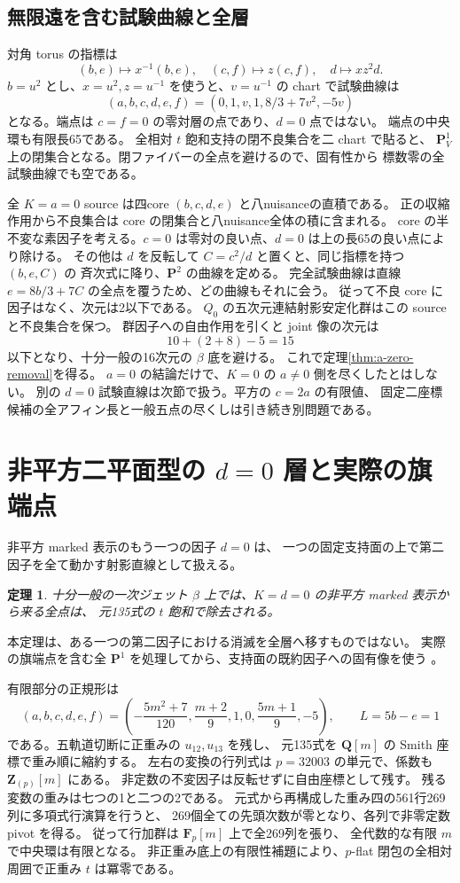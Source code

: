 \documentclass[11pt,a4paper]{ltjsarticle}
\newcommand{\QQ}{\mathbf Q}
\newcommand{\PP}{\mathbf P}
\newtheorem{theorem}{定理}[section]
\theoremstyle{remark}
\begin{document}
\subsection{無限遠を含む試験曲線と全層}
対角 torus の指標は
\[
 (b,e)\mapsto x^{-1}(b,e),\quad(c,f)\mapsto z(c,f),
 \quad d\mapsto xz^2d.
\]
$b=u^2$ とし、$x=u^2,z=u^{-1}$ を使うと、$v=u^{-1}$ の chart で試験曲線は
\[
 (a,b,c,d,e,f)=(0,1,v,1,8/3+7v^2,-5v)
\]
となる。端点は $c=f=0$ の零対層の点であり、$d=0$ 点ではない。
端点の中央環も有限長65である。
全相対 $t$ 飽和支持の閉不良集合を二 chart で貼ると、
$\PP^1_V$ 上の閉集合となる。閉ファイバーの全点を避けるので、固有性から
標数零の全試験曲線でも空である。

全 $K=a=0$ source は四core $(b,c,d,e)$ と八nuisanceの直積である。
正の収縮作用から不良集合は core の閉集合と八nuisance全体の積に含まれる。
core の半不変な素因子を考える。$c=0$ は零対の良い点、$d=0$ は上の長65の良い点により除ける。
その他は $d$ を反転して $C=c^2/d$ と置くと、同じ指標を持つ $(b,e,C)$ の
斉次式に降り、$\PP^2$ の曲線を定める。
完全試験曲線は直線 $e=8b/3+7C$ の全点を覆うため、どの曲線もそれに会う。
従って不良 core に因子はなく、次元は2以下である。
$Q_0$ の五次元連結射影安定化群はこの source と不良集合を保つ。
群因子への自由作用を引くと joint 像の次元は
\[
 10+(2+8)-5=15
\]
以下となり、十分一般の16次元の $\beta$ 底を避ける。
これで定理\ref{thm:a-zero-removal}を得る。
$a=0$ の結論だけで、$K=0$ の $a\ne0$ 側を尽くしたとはしない。
別の $d=0$ 試験直線は次節で扱う。平方の $c=2a$ の有限値、
固定二座標候補の全アフィン長と一般五点の尽くしは引き続き別問題である。

\section{非平方二平面型の $d=0$ 層と実際の旗端点}
\label{sec:d-zero-removal}
非平方 marked 表示のもう一つの因子 $d=0$ は、
一つの固定支持面の上で第二因子を全て動かす射影直線として扱える。
\begin{theorem}\label{thm:d-zero-removal}
十分一般の一次ジェット $\beta$ 上では、$K=d=0$ の非平方 marked 表示から来る全点は、
元135式の $t$ 飽和で除去される。
\end{theorem}
本定理は、ある一つの第二因子における消滅を全層へ移すものではない。
実際の旗端点を含む全 $\PP^1$ を処理してから、支持面の既約因子への固有像を使う
\cite{d-zero-bridge-v61,d-zero-review-v61}。

有限部分の正規形は
\[
 (a,b,c,d,e,f)=\left(-\frac{5m^2+7}{120},\frac{m+2}{9},1,0,
                   \frac{5m+1}{9},-5\right),\qquad L=5b-e=1
\]
である。五軌道切断に正重みの $u_{12},u_{13}$ を残し、
元135式を $\QQ[m]$ の Smith 座標で重み順に縮約する。
左右の変換の行列式は $p=32003$ の単元で、係数も $\mathbf Z_{(p)}[m]$ にある。
非定数の不変因子は反転せずに自由座標として残す。
残る変数の重みは七つの1と二つの2である。
元式から再構成した重み四の561行269列に多項式行演算を行うと、
269個全ての先頭次数が零となり、各列で非零定数 pivot を得る。
従って行加群は $\mathbf F_p[m]$ 上で全269列を張り、
全代数的な有限 $m$ で中央環は有限となる\cite{d-zero-pencil-v61}。
非正重み底上の有限性補題により、$p$-flat 閉包の全相対周囲で正重み $t$ は冪零である。
\end{document}
